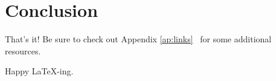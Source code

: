 \chapter{Conclusion}
That's it!
Be sure to check out Appendix \ref{ap:links}~ for some additional resources.
\par
Happy \LaTeX-ing.